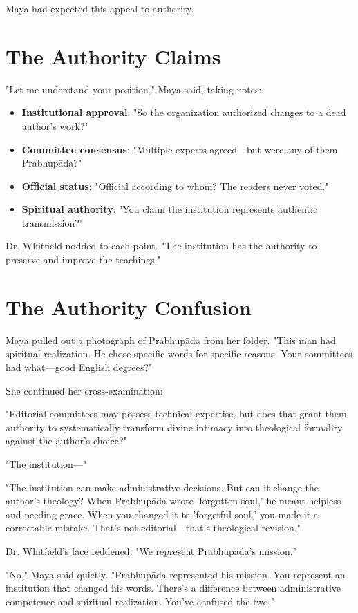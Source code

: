 \documentclass[11pt,twoside]{book}
\begin{document}
Maya had expected this appeal to authority.
\section*{The Authority Claims}
\label{sec:org26029ea}

"Let me understand your position," Maya said, taking notes:

\begin{itemize}
\item \textbf{\textbf{Institutional approval}}: "So the organization authorized changes to a dead author's work?"
\item \textbf{\textbf{Committee consensus}}: "Multiple experts agreed—but were any of them Prabhupāda?"
\item \textbf{\textbf{Official status}}: "Official according to whom? The readers never voted."
\item \textbf{\textbf{Spiritual authority}}: "You claim the institution represents authentic transmission?"
\end{itemize}

Dr. Whitfield nodded to each point. "The institution has the authority to preserve and improve the teachings."
\section*{The Authority Confusion}
\label{sec:org26096d4}

Maya pulled out a photograph of Prabhupāda from her folder. "This man had spiritual realization. He chose specific words for specific reasons. Your committees had what—good English degrees?"

She continued her cross-examination:

"Editorial committees may possess technical expertise, but does that grant them authority to systematically transform divine intimacy into theological formality against the author's choice?"

"The institution—"

"The institution can make administrative decisions. But can it change the author's theology? When Prabhupāda wrote 'forgotten soul,' he meant helpless and needing grace. When you changed it to 'forgetful soul,' you made it a correctable mistake. That's not editorial—that's theological revision."

Dr. Whitfield's face reddened. "We represent Prabhupāda's mission."

"No," Maya said quietly. "Prabhupāda represented his mission. You represent an institution that changed his words. There's a difference between administrative competence and spiritual realization. You've confused the two."
\end{document}
